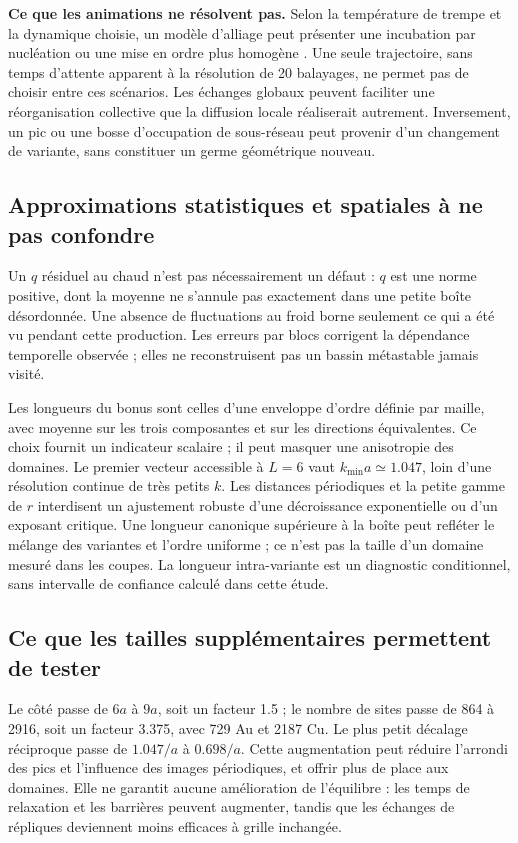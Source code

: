 \documentclass[10pt,a4paper]{article}
\begin{document}
\textbf{Ce que les animations ne résolvent pas.} Selon la température de
trempe et la dynamique choisie, un modèle d'alliage peut présenter une
incubation par nucléation ou une mise en ordre plus homogène
\cite{kessler}. Une seule trajectoire, sans temps d'attente apparent à
la résolution de 20 balayages, ne permet pas de choisir entre ces scénarios.
Les échanges globaux peuvent faciliter une réorganisation collective que
la diffusion locale réaliserait autrement. Inversement, un pic ou une
bosse d'occupation de sous-réseau peut provenir d'un changement de variante,
sans constituer un germe géométrique nouveau.

\subsection{Approximations statistiques et spatiales à ne pas confondre}
Un $q$ résiduel au chaud n'est pas nécessairement un défaut : $q$ est une
norme positive, dont la moyenne ne s'annule pas exactement dans une petite
boîte désordonnée. Une absence de fluctuations au froid borne seulement
ce qui a été vu pendant cette production. Les erreurs par blocs corrigent
la dépendance temporelle observée ; elles ne reconstruisent pas un bassin
métastable jamais visité.

Les longueurs du bonus sont celles d'une enveloppe d'ordre définie par
maille, avec moyenne sur les trois composantes et sur les directions
équivalentes. Ce choix fournit un indicateur scalaire ; il peut masquer
une anisotropie des domaines. Le premier vecteur accessible à $L=6$ vaut
$k_{\min}a\simeq1.047$, loin d'une résolution continue de très petits $k$.
Les distances périodiques et la petite gamme de $r$ interdisent un ajustement
robuste d'une décroissance exponentielle ou d'un exposant critique.
Une longueur canonique supérieure à la boîte peut refléter le mélange
des variantes et l'ordre uniforme ; ce n'est pas la taille d'un domaine
mesuré dans les coupes. La longueur intra-variante est un diagnostic
conditionnel, sans intervalle de confiance calculé dans cette étude.

\subsection{Ce que les tailles supplémentaires permettent de tester}
Le côté passe de $6a$ à $9a$, soit un facteur 1.5 ; le nombre de sites
passe de 864 à 2916, soit un facteur 3.375, avec 729 Au et 2187 Cu.
Le plus petit décalage réciproque passe de $1.047/a$ à $0.698/a$.
Cette augmentation peut réduire l'arrondi des pics et l'influence des
images périodiques, et offrir plus de place aux domaines. Elle ne garantit
aucune amélioration de l'équilibre : les temps de relaxation et les
barrières peuvent augmenter, tandis que les échanges de répliques
deviennent moins efficaces à grille inchangée.
\end{document}
